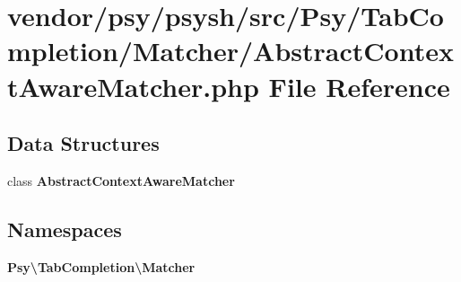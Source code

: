 \section{vendor/psy/psysh/src/\+Psy/\+Tab\+Completion/\+Matcher/\+Abstract\+Context\+Aware\+Matcher.php File Reference}
\label{_abstract_context_aware_matcher_8php}
\subsection*{Data Structures}
\begin{DoxyCompactItemize}
\item 
class {\bf Abstract\+Context\+Aware\+Matcher}
\end{DoxyCompactItemize}
\subsection*{Namespaces}
\begin{DoxyCompactItemize}
\item 
 {\bf Psy\textbackslash{}\+Tab\+Completion\textbackslash{}\+Matcher}
\end{DoxyCompactItemize}
